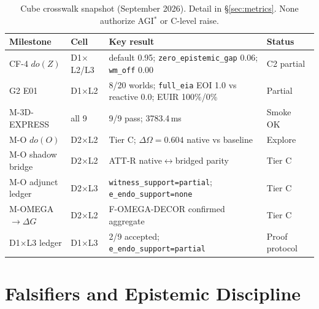 \documentclass[11pt,a4paper]{article}
\theoremstyle{definition}
\begin{document}
\begin{table}[H]
\centering\small
\begin{tabular}{llp{5.5cm}l}
\toprule Milestone & Cell & Key result & Status \\ \midrule
CF-4 $do(Z)$ & D1$\times$L2/L3 & default 0.95; \texttt{zero\_epistemic\_gap} 0.06; \texttt{wm\_off} 0.00 & C2 partial~\cite{kuznetsov2026cf4} \\
G2 E01 & D1$\times$L2 & 8/20 worlds; \texttt{full\_eia} EOI 1.0 vs reactive 0.0; EUIR 100\%/0\% & Partial~\cite{kuznetsov2026g2e01} \\
M-3D-EXPRESS & all 9 & 9/9 pass; 3783.4\,ms & Smoke OK~\cite{kuznetsov2026express} \\
M-O $do(O)$ & D2$\times$L2 & Tier C; $\Delta\Omega=0.604$ native vs baseline & Explore~\cite{kuznetsov2026mo} \\
M-O shadow bridge & D2$\times$L2 & ATT-R native$\leftrightarrow$bridged parity & Tier C \\
M-O adjunct ledger & D2$\times$L3 & \texttt{witness\_support=partial}; \texttt{e\_endo\_support=none} & Tier C \\
M-OMEGA$\to\Delta G$ & D2$\times$L2 & F-OMEGA-DECOR confirmed aggregate & Tier C~\cite{kuznetsov2026omega_delta} \\
D1$\times$L3 ledger & D1$\times$L3 & 2/9 accepted; \texttt{e\_endo\_support=partial} & Proof protocol~\cite{kuznetsov2026proof} \\ \bottomrule
\end{tabular}
\caption{Cube crosswalk snapshot (September 2026). Detail in \S\ref{sec:metrics}. None authorize AGI$^{*}$ or C-level raise.}
\label{tab:empirical}
\end{table}

\section{Falsifiers and Epistemic Discipline}\label{sec:falsifiers}
\end{document}
